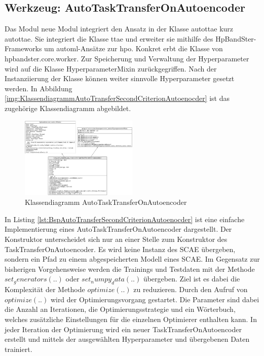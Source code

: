 	\subsection{Werkzeug: AutoTaskTransferOnAutoencoder}
	\label{subsec:AutoTaskTransferOnAutoencoder}
	Das Modul neue Modul integriert den Ansatz in der Klasse \acl{autottae} kurz \ac{autottae}. Sie integriert die Klasse \acl{ttae} und erweiter sie mithilfe des HpBandSter-Frameworks um \ac{automl}-Ansätze zur \ac{hpo}. Konkret erbt die Klasse von hpbandster.core.worker. Zur Speicherung und Verwaltung der Hyperparameter wird auf die Klasse HyperparameterMixin zurückgegriffen. Nach der Instanziierung der Klasse können weiter sinnvolle Hyperparameter gesetzt werden.
	In Abbildung \ref{img:KlassendiagrammAutoTransferSecondCriterionAutoenocder}  ist das zugehörige Klassendiagramm abgebildet. 
	\begin{figure}[h]
		\centering
		\includegraphics[width=0.5\textwidth, center]{bilder/Klassendiagramme/AutoTTAE.png}
		\caption[Klassendiagramm AutoTaskTransferOnAutoencoder]{Klassendiagramm AutoTaskTransferOnAutoencoder}
		\label{img:KlassendiagrammAutoTaskTransferOnAutoencoder}
	\end{figure}  
	In Listing \ref{lst:BspAutoTransferSecondCriterionAutoenocder} ist eine einfache Implementierung eines AutoTaskTransferOnAutoencoder dargestellt. Der Konstruktor unterscheidet sich nur an einer Stelle zum Konstruktor des TaskTransferOnAutoencoder. Es wird keine Instanz des SCAE übergeben, sondern ein Pfad zu einem abgespeicherten Modell eines SCAE. 
	Im Gegensatz zur bisherigen Vorgehensweise werden die Trainings und Testdaten mit der Methode $set_generators(..)$  oder $set_numpy_data(..)$ übergeben. Ziel ist es dabei die Komplexität der Methode $optimize(..)$ zu reduzieren. Durch den Aufruf von $optimize(..)$ wird der Optimierungsvorgang gestartet. Die Parameter sind dabei die Anzahl an Iterationen, die Optimierungsstrategie und ein Wörterbuch, welches zusätzliche Einstellungen für die einzelnen Optimierer enthalten kann. In jeder Iteration der Optimierung wird ein neuer TaskTransferOnAutoencoder erstellt und mittels der ausgewählten Hyperparameter und übergebenen Daten trainiert. 
